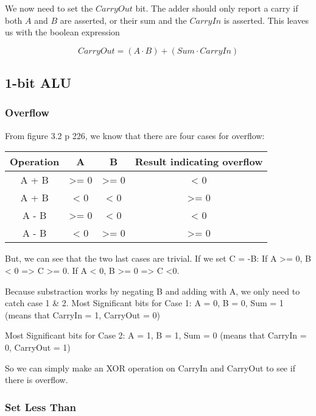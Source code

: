 \documentclass[11pt,a4paper]{article}
\begin{document}
We now need to set the $CarryOut$ bit. The adder should only report a
carry if both $A$ and $B$ are asserted, or their sum and the $CarryIn$ is asserted.
This leaves us with the boolean expression

\begin{equation*}
    CarryOut = (A \cdot B) + (Sum \cdot CarryIn)
\end{equation*}


\subsection*{1-bit ALU} %
\label{sub:1-bit_ALU}

\subsubsection*{Overflow}

From figure 3.2 p 226, we know that there are four cases for overflow:
\begin{table}[htb!]
\begin{tabular}{| c | c | c | c |}
    \centering
    Operation & A & B & Result indicating overflow \\ \hline
    A + B & >= 0 & >= 0 & < 0 \\
    A + B & < 0 & < 0 & >= 0 \\
    A - B & >= 0 & < 0 & < 0 \\
    A - B & < 0 & >= 0 & >= 0 \\
\end{tabular}
\end{table}

But, we can see that the two last cases are trivial. If we set C = -B:
If A >= 0, B < 0 => C >= 0.
If A < 0, B >= 0 => C <0.

Because substraction works by negating B and adding with A, we only need to catch case 1 \& 2.
Most Significant bits for Case 1:
A = 0, B = 0, Sum = 1 (means that CarryIn = 1, CarryOut = 0)

Most Significant bits for Case 2:
A = 1, B = 1, Sum = 0 (means that CarryIn = 0, CarryOut = 1)

So we can simply make an XOR operation on CarryIn and CarryOut to see if there is overflow.


\subsubsection*{Set Less Than}

\end{document}
